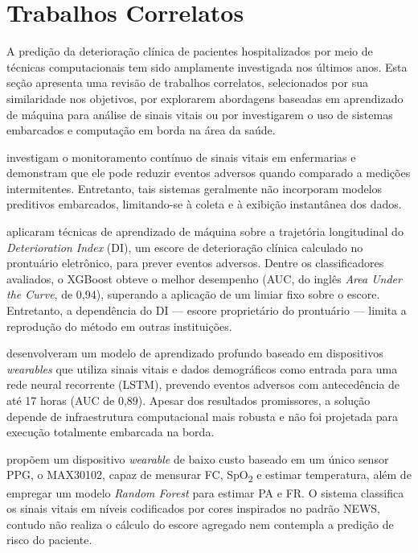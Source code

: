 \section{Trabalhos Correlatos}
\label{Correlatos}

A predição da deterioração clínica de pacientes hospitalizados por meio de técnicas computacionais tem sido amplamente investigada nos últimos anos. Esta seção apresenta uma revisão de trabalhos correlatos, selecionados por sua similaridade nos objetivos, por explorarem abordagens baseadas em aprendizado de máquina para análise de sinais vitais ou por investigarem o uso de sistemas embarcados e computação em borda na área da saúde.

 investigam o monitoramento contínuo de sinais vitais em enfermarias e demonstram que ele pode reduzir eventos adversos quando comparado a medições intermitentes. Entretanto, tais sistemas geralmente não incorporam modelos preditivos embarcados, limitando-se à coleta e à exibição instantânea dos dados.

 aplicaram técnicas de aprendizado de máquina sobre a trajetória longitudinal do \textit{Deterioration Index} (DI), um escore de deterioração clínica calculado no prontuário eletrônico, para prever eventos adversos. Dentre os classificadores avaliados, o XGBoost obteve o melhor desempenho (AUC, do inglês \textit{Area Under the Curve}, de 0,94), superando a aplicação de um limiar fixo sobre o escore. Entretanto, a dependência do DI --- escore proprietário do prontuário --- limita a reprodução do método em outras instituições.
 
 desenvolveram um modelo de aprendizado profundo baseado em dispositivos \textit{wearables} que utiliza sinais vitais e dados demográficos como entrada para uma rede neural recorrente (LSTM), prevendo eventos adversos com antecedência de até 17 horas (AUC de 0,89). Apesar dos resultados promissores, a solução depende de infraestrutura computacional mais robusta e não foi projetada para execução totalmente embarcada na borda.

 propõem um dispositivo \textit{wearable} de baixo custo baseado em um único sensor PPG, o MAX30102, capaz de mensurar FC, SpO\textsubscript{2} e estimar temperatura, além de empregar um modelo \textit{Random Forest} para estimar PA e FR. O sistema classifica os sinais vitais em níveis codificados por cores inspirados no padrão NEWS, contudo não realiza o cálculo do escore agregado nem contempla a predição de risco do paciente.


